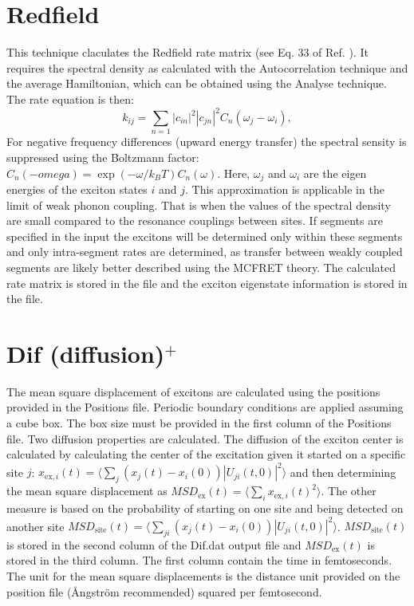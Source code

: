 \section{Redfield}
This technique claculates the Redfield rate matrix (see Eq. 33 of Ref.
).
It requires the spectral density as calculated with the Autocorrelation technique and
the average Hamiltonian, which can be obtained using the Analyse technique.
The rate equation is then:
\begin{equation}
	k_{ij}=\sum_{n=1} |c_{in}|^2|c_{jn}|^2 C_n(\omega_j-\omega_i),
\end{equation}
For negative frequency differences (upward energy transfer) the spectral sensity is
suppressed using the Boltzmann factor: $C_n(-omega)=\exp(-\omega/k_B T)C_n(\omega)$.
Here, $\omega_j$ and $\omega_i$ are the eigen energies of the exciton states $i$ and
$j$. This approximation is applicable in the limit of weak phonon coupling.
That is when the values of the spectral density are small compared to the resonance
couplings between sites. If segments are specified in the input the excitons will be
determined only within these segments and only intra-segment rates are determined,
as transfer between weakly coupled segments are likely better described using the
MCFRET theory. The calculated rate matrix is stored in the file 
and the exciton eigenstate information is stored in the  file.

\section{Dif (diffusion)$^{+}$}
The mean square displacement of excitons are calculated using the positions provided
in the Positions file. Periodic boundary conditions are applied assuming a cube box.
The box size must be provided in the first column of the Positions file. Two diffusion
properties are calculated. The diffusion of the exciton center is calculated by
calculating the center of the excitation given it started on a specific site $j$:
$x_{\textrm{ex},i}(t)=\langle \sum_j (x_j(t)-x_i(0)) |U_{ji}(t,0)|^2\rangle$ and then
determining the mean square displacement as $MSD_{\textrm{ex}}(t)=\langle \sum_i  x_{\textrm{ex},i}(t)^2\rangle$.
The other measure is based on the probability of starting on one site and being
detected on another site $MSD_{\textrm{site}}(t)=\langle \sum_{ji} (x_j(t)-x_i(0))|U_{ji}(t,0)|^2\rangle$.
$MSD_{\textrm{site}}(t)$ is stored in the second column of the Dif.dat output file and
$MSD_{\textrm{ex}}(t)$ is stored in the third column. The first column contain the
time in femtoseconds. The unit for the mean square displacements is the distance unit
provided on the position file (\AA ngstr\"{o}m recommended) squared per femtosecond. 
